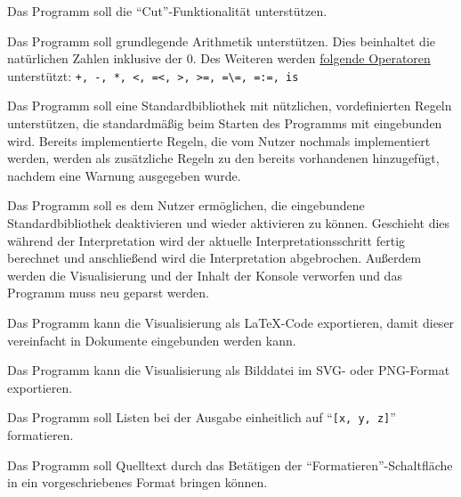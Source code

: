\documentclass[parskip=full,11pt,twoside]{scrartcl}
\begin{document}

Das Programm soll die \enquote{Cut}-Funktionalität unterstützen.


Das Programm soll grundlegende Arithmetik unterstützen. Dies beinhaltet die natürlichen Zahlen inklusive der 0. Des Weiteren werden \hyperref[glossary]{folgende Operatoren} unterstützt:
\texttt{+, -, *, <, =<, >, >=, =\textbackslash=, =:=, is}


Das Programm soll eine Standardbibliothek mit nützlichen, vordefinierten Regeln unterstützen, die standardmäßig beim Starten des Programms mit eingebunden wird. Bereits implementierte Regeln, die vom Nutzer nochmals implementiert werden, werden als zusätzliche Regeln zu den bereits vorhandenen hinzugefügt, nachdem eine Warnung ausgegeben wurde.


Das Programm soll es dem Nutzer ermöglichen, die eingebundene Standardbibliothek deaktivieren und wieder aktivieren zu können. Geschieht dies während der Interpretation wird der aktuelle Interpretationsschritt fertig berechnet und anschließend wird die Interpretation abgebrochen. Außerdem werden die Visualisierung und der Inhalt der Konsole verworfen und das Programm muss neu geparst werden.


Das Programm kann die Visualisierung als LaTeX-Code exportieren, damit dieser vereinfacht in Dokumente eingebunden werden kann.


Das Programm kann die Visualisierung als Bilddatei im SVG- oder PNG-Format exportieren.


Das Programm soll Listen bei der Ausgabe einheitlich auf \enquote{\texttt{[x, y, z]}} formatieren.


Das Programm soll Quelltext durch das Betätigen der \enquote{Formatieren}-Schaltfläche in ein vorgeschriebenes Format bringen können.
\end{document}

